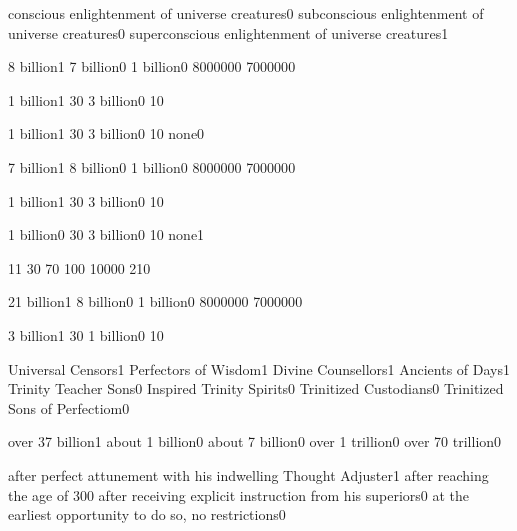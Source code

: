 {conscious enlightenment of universe creatures}{0}
{subconscious enlightenment of universe creatures}{0}
{superconscious enlightenment of universe creatures}{1}
\qstop

{8 billion}{1}
{7 billion}{0}
{1 billion}{0}
{800000}{0}
{700000}{0}
\qstop

{1 billion}{1}
{3}{0}
{3 billion}{0}
{1}{0}
\qstop

{1 billion}{1}
{3}{0}
{3 billion}{0}
{1}{0}
{none}{0}
\qstop

{7 billion}{1}
{8 billion}{0}
{1 billion}{0}
{800000}{0}
{700000}{0}
\qstop

{1 billion}{1}
{3}{0}
{3 billion}{0}
{1}{0}
\qstop

{1 billion}{0}
{3}{0}
{3 billion}{0}
{1}{0}
{none}{1}
\qstop

{1}{1}
{3}{0}
{7}{0}
{10}{0}
{1000}{0}
{21}{0}
\qstop

{21 billion}{1}
{8 billion}{0}
{1 billion}{0}
{800000}{0}
{700000}{0}
\qstop

{3 billion}{1}
{3}{0}
{1 billion}{0}
{1}{0}
\qstop

{Universal Censors}{1}
{Perfectors of Wisdom}{1}
{Divine Counsellors}{1}
{Ancients of Days}{1}
{Trinity Teacher Sons}{0}
{Inspired Trinity Spirits}{0}
{Trinitized Custodians}{0}
{Trinitized Sons of Perfectiom}{0}
\qstop

{over 37 billion}{1}
{about 1 billion}{0}
{about 7 billion}{0}
{over 1 trillion}{0}
{over 70 trillion}{0}
\qstop


{after perfect attunement with his indwelling Thought Adjuster}{1}
{after reaching the age of 30}{0}
{after receiving explicit instruction from his superiors}{0}
{at the earliest opportunity to do so, no restrictions}{0}
\qstop

